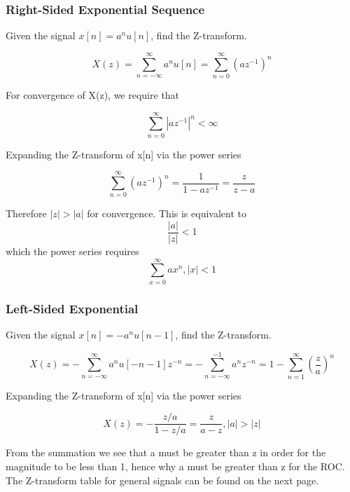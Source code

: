 \documentclass{article}
\begin{document}
\subsubsection{Right-Sided Exponential Sequence}
Given the signal $x[n]= a^nu[n]$, find the Z-transform.
\begin{center}
$$X(z) = \sum_{n=-\infty}^{\infty}a^nu[n] =\sum_{n=0}^{\infty}(az^{-1})^n$$
\end{center}
For convergence of X(z), we require that
\begin{center}
$$\sum_{n=0}^{\infty}|az^{-1}|^n < \infty$$
\end{center}
Expanding the Z-transform of x[n] via the power series
\begin{center}
$$\sum_{n=0}^{\infty}(az^{-1})^n = \frac{1}{1-az^{-1}}=\frac{z}{z-a}$$
\end{center}
Therefore $|z| > |a|$ for convergence. This is equivalent to $$\frac{|a|}{|z|}<1$$ which the power series requires $$\sum_{x=0}^{\infty}ax^n,|x|<1$$
\subsubsection{Left-Sided Exponential}
Given the signal $x[n]= -a^nu[n-1]$, find the Z-transform.
\begin{center}
$$X(z) = -\sum_{n=-\infty}^{\infty}a^nu[-n-1]z^{-n} =-\sum_{n=-\infty}^{-1}a^{n}z^{-n}= 1 -\sum_{n=1}^{\infty}(\frac{z}{a}
)^n$$
\end{center}
Expanding the Z-transform of x[n] via the power series
\begin{center}
$$X(z) = -\frac{z/a}{1-z/a}=\frac{z}{a-z}, |a| > |z|$$
\end{center}
From the summation we see that a must be greater than z in order for the magnitude to be less than 1, hence why a must be greater than z for the ROC. The Z-transform table for general signals can be found on the next page.
\end{document}
